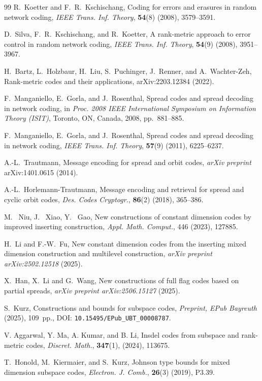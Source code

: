 \documentclass{svproc}
\begin{document}
\begin{thebibliography}{99}
R.~Koetter and F.~R.~Kschischang,
Coding for errors and erasures in random network coding,
\textit{IEEE Trans. Inf. Theory}, \textbf{54}(8) (2008), 3579--3591.

D.~Silva, F.~R.~Kschischang, and R.~Koetter,
A rank-metric approach to error control in random network coding,
\textit{IEEE Trans. Inf. Theory}, \textbf{54}(9) (2008), 3951--3967.

H.~Bartz, L.~Holzbaur, H.~Liu, S.~Puchinger, J.~Renner, and A.~Wachter-Zeh,
Rank-metric codes and their applications,
arXiv:2203.12384 (2022).

F.~Manganiello, E.~Gorla, and J.~Rosenthal,
Spread codes and spread decoding in network coding,
in \textit{Proc. 2008 IEEE International Symposium on Information Theory (ISIT)},
Toronto, ON, Canada, 2008, pp.~881--885.

F.~Manganiello, E.~Gorla, and J.~Rosenthal,
Spread codes and spread decoding in network coding,
\textit{IEEE Trans. Inf. Theory}, \textbf{57}(9) (2011), 6225--6237.

A.-L.~Trautmann,
Message encoding for spread and orbit codes,
\textit{arXiv preprint} arXiv:1401.0615 (2014).

A.-L.~Horlemann-Trautmann,
Message encoding and retrieval for spread and cyclic orbit codes,
\textit{Des. Codes Cryptogr.}, \textbf{86}(2) (2018), 365--386.

M. ~Niu, J. ~Xiao, Y. ~Gao,
New constructions of constant dimension codes by improved inserting construction,
\textit{Appl. Math. Comput.},
446 (2023),
127885.

H.~Li and F.-W.~Fu,
New constant dimension codes from the inserting mixed dimension construction and multilevel construction,
\textit{arXiv preprint arXiv:2502.12518} (2025).

X.~Han, X.~Li and G.~Wang,
New constructions of full flag codes based on partial spreads,
\textit{arXiv preprint arXiv:2506.15127} (2025).

S.~Kurz,
Constructions and bounds for subspace codes,
\textit{Preprint, EPub Bayreuth} (2025), 109~pp., DOI: \texttt{10.15495/EPub\_UBT\_00008787}.

V. Aggarwal, Y. Ma, A. Kumar, and B. Li,
Insdel codes from subspace and rank-metric codes,
\textit{Discret. Math.}, \textbf{347}(1), (2024), 113675.



T.~Honold, M.~Kiermaier, and S.~Kurz,
Johnson type bounds for mixed dimension subspace codes,
\textit{Electron. J. Comb.}, \textbf{26}(3) (2019), P3.39.


\end{thebibliography}
\end{document}
